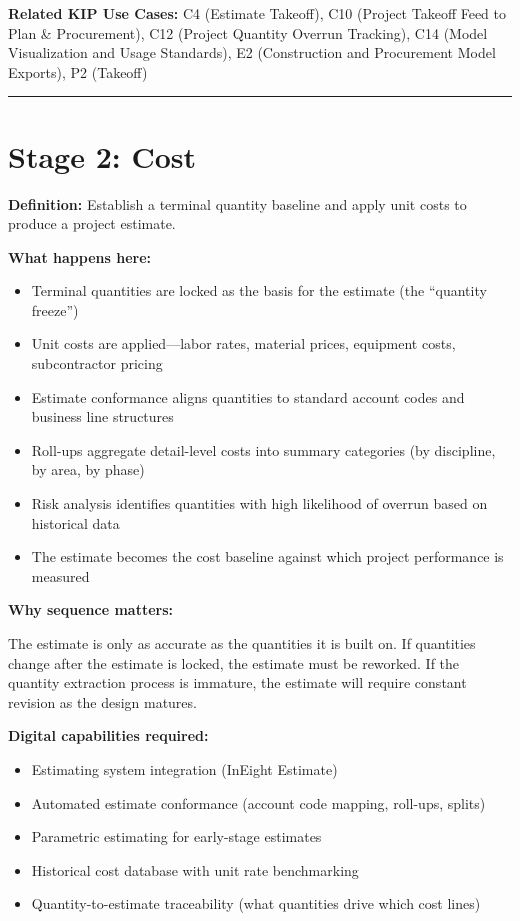 \documentclass[11pt, letterpaper]{article}
\begin{document}
\textbf{Related KIP Use Cases:} C4 (Estimate Takeoff), C10 (Project Takeoff Feed to Plan \& Procurement), C12 (Project Quantity Overrun Tracking), C14 (Model Visualization and Usage Standards), E2 (Construction and Procurement Model Exports), P2 (Takeoff)

\vspace{1em}

\hrule

\vspace{1em}

\section*{Stage 2: Cost}

\textbf{Definition:} Establish a terminal quantity baseline and apply unit costs to produce a project estimate.

\textbf{What happens here:}
\begin{itemize}
    \item Terminal quantities are locked as the basis for the estimate (the ``quantity freeze'')
    \item Unit costs are applied---labor rates, material prices, equipment costs, subcontractor pricing
    \item Estimate conformance aligns quantities to standard account codes and business line structures
    \item Roll-ups aggregate detail-level costs into summary categories (by discipline, by area, by phase)
    \item Risk analysis identifies quantities with high likelihood of overrun based on historical data
    \item The estimate becomes the cost baseline against which project performance is measured
\end{itemize}

\textbf{Why sequence matters:}

The estimate is only as accurate as the quantities it is built on. If quantities change after the estimate is locked, the estimate must be reworked. If the quantity extraction process is immature, the estimate will require constant revision as the design matures.

\textbf{Digital capabilities required:}
\begin{itemize}
    \item Estimating system integration (InEight Estimate)
    \item Automated estimate conformance (account code mapping, roll-ups, splits)
    \item Parametric estimating for early-stage estimates
    \item Historical cost database with unit rate benchmarking
    \item Quantity-to-estimate traceability (what quantities drive which cost lines)
\end{itemize}
\end{document}
